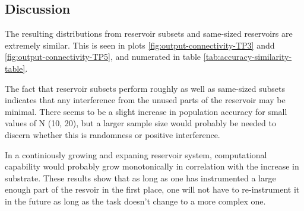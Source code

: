 \begin{figure*}[ht]
    \centering
    \caption{
        N-sized reservoir to subset comparison plots for task TP5 up to a reservoir size of 140.
        N-subset performance is practically identical to a same-sized reservoir.
        Subfigure \ref{fig:output-connectivity-TP5-composite} shows best n-sized reservoir performance,
        while subfigure \ref{fig:output-connectivity-TP5-subset} shows reservoir subset performance.
    }
    \label{fig:output-connectivity-TP5}
\end{figure*}

\label{tab:accuracy-similarity-table}

\subsection{Discussion}

The resulting distributions from reservoir subsets and same-sized reservoirs are extremely similar.
This is seen in plots \ref{fig:output-connectivity-TP3} andd \ref{fig:output-connectivity-TP5},
and numerated in table \ref{tab:accuracy-similarity-table}.


The fact that reservoir subsets perform roughly as well as same-sized subsets indicates that any interference from the unused parts of the reservoir may be minimal.
There seems to be a slight increase in population accuracy for small values of N (10, 20),
but a larger sample size would probably be needed to discern whether this is randomness or positive interference.

In a continiously growing and expaning reservoir system,
computational capability would probably grow monotonically in correlation with the increase in substrate.
These results show that as long as one has instrumented a large enough part of the resvoir in the first place,
one will not have to re-instrument it in the future as long as the task doesn't change to a more complex one.

